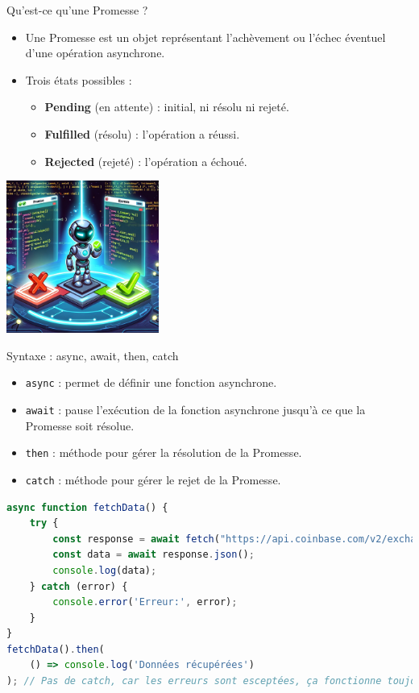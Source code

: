 \documentclass{beamer}
\begin{document}
    \begin{frame}{Qu'est-ce qu'une Promesse ?}
        \begin{itemize}
            \item Une Promesse est un objet représentant l'achèvement ou l'échec éventuel d'une opération asynchrone.
            \item Trois états possibles :
            \begin{itemize}
                \item \textbf{Pending} (en attente) : initial, ni résolu ni rejeté.
                \item \textbf{Fulfilled} (résolu) : l'opération a réussi.
                \item \textbf{Rejected} (rejeté) : l'opération a échoué.
            \end{itemize}
        \end{itemize}
        \bigbreak
        \centering
        \includegraphics[width=5cm]{image/promise}
    \end{frame}

    \begin{frame}[fragile]{Syntaxe : async, await, then, catch}
        \begin{itemize}
            \item \lstinline{async} : permet de définir une fonction asynchrone.
            \item \lstinline{await} : pause l'exécution de la fonction asynchrone jusqu'à ce que la Promesse soit résolue.
            \item \lstinline{then} : méthode pour gérer la résolution de la Promesse.
            \item \lstinline{catch} : méthode pour gérer le rejet de la Promesse.
        \end{itemize}
        \begin{lstlisting}[language=JavaScript,title={\tiny{Script JavaScript}}]
async function fetchData() {
    try {
        const response = await fetch("https://api.coinbase.com/v2/exchange-rates?currency=BTC");
        const data = await response.json();
        console.log(data);
    } catch (error) {
        console.error('Erreur:', error);
    }
}
fetchData().then(
    () => console.log('Données récupérées')
); // Pas de catch, car les erreurs sont esceptées, ça fonctionne toujours
        \end{lstlisting}
    \end{frame}
\end{document}
